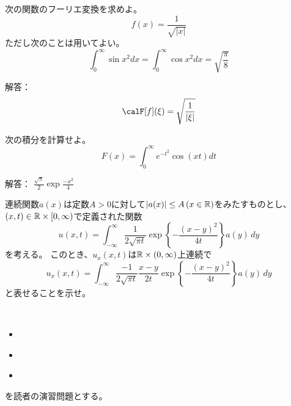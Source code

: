 \documentclass[report]{jlreq}
\begin{document}
\begin{problem}
    次の関数のフーリエ変換を求めよ。
    \begin{equation}
        f(x) = \frac{1}{\sqrt{|x|}}
    \end{equation}
    ただし次のことは用いてよい。
    \begin{equation}
        \int_0^\infty \sin x^2 dx = \int_0^\infty \cos x^2 dx = \sqrt{\frac{\pi}{8}}
    \end{equation}

    解答：
    \begin{equation}
        \calF[f](\xi) = \sqrt{\frac{1}{|\xi|}}
    \end{equation}
\end{problem}

\begin{problem}
    次の積分を計算せよ。
    \begin{equation}
        F(x) = \int_0^\infty e^{-t^2} \cos(xt) dt
    \end{equation}

    解答： $\frac{\sqrt{\pi}}{2} \exp\frac{-x^2}{4}$
\end{problem}

\begin{problem}
    連続関数$a(x)$は定数$A > 0$に対して$|a(x)| \le A\, (x \in \mathbb{R})$をみたすものとし、
    $(x, t) \in \mathbb{R} \times [0, \infty)$で定義された関数
    \begin{equation}
        u(x, t) = \int_{-\infty}^\infty
            \frac{1}{2\sqrt{\pi t}} \exp\left\{ - \frac{(x - y)^2}{4t} \right\} a(y)\, dy
    \end{equation}
    を考える。
    このとき、$u_x(x, t)$は$\mathbb{R} \times (0, \infty)$上連続で
    \begin{equation}
        u_x(x, t) = \int_{-\infty}^\infty
            \frac{-1}{2\sqrt{\pi t}}
            \frac{x - y}{2t}
            \exp\left\{ - \frac{(x - y)^2}{4t} \right\} a(y)\, dy
    \end{equation}
    と表せることを示せ。
\end{problem}

\begin{problem}
    \,
    \begin{itemize}
        \item \cite[第VII章{\S}6 問題1)]{杉浦85}
        \item \cite[第III章 問7.1 (1)]{杉浦+89}
        \item \cite[第III章 問7.2 (1)]{杉浦+89}
    \end{itemize}
    を読者の演習問題とする。
\end{problem}
\end{document}
